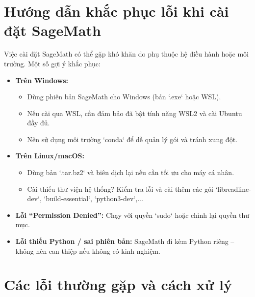 \section{Hướng dẫn khắc phục lỗi khi cài đặt SageMath}

Việc cài đặt SageMath có thể gặp khó khăn do phụ thuộc hệ điều hành hoặc môi trường. Một số gợi ý khắc phục:

\begin{itemize}
	\item \textbf{Trên Windows:}
	\begin{itemize}
		\item Dùng phiên bản SageMath cho Windows (bản `.exe` hoặc WSL).
		\item Nếu cài qua WSL, cần đảm bảo đã bật tính năng WSL2 và cài Ubuntu đầy đủ.
		\item Nên sử dụng môi trường `conda` để dễ quản lý gói và tránh xung đột.
	\end{itemize}
	\item \textbf{Trên Linux/macOS:}
	\begin{itemize}
		\item Dùng bản `.tar.bz2` và biên dịch lại nếu cần tối ưu cho máy cá nhân.
		\item Cài thiếu thư viện hệ thống? Kiểm tra lỗi và cài thêm các gói `libreadline-dev`, `build-essential`, `python3-dev`,...
	\end{itemize}
	\item \textbf{Lỗi “Permission Denied”:} Chạy với quyền `sudo` hoặc chỉnh lại quyền thư mục.
	\item \textbf{Lỗi thiếu Python / sai phiên bản:} SageMath đi kèm Python riêng – không nên can thiệp nếu không có kinh nghiệm.
\end{itemize}

\section{Các lỗi thường gặp và cách xử lý}

